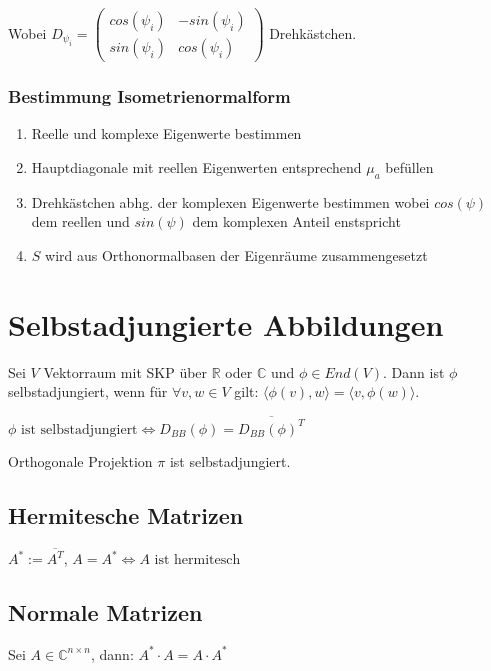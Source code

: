Wobei $D_{\psi_i} = \begin{pmatrix} cos(\psi_i) & -sin(\psi_i) \\ sin(\psi_i) & cos(\psi_i) \end{pmatrix}$ Drehkästchen.

\subsubsection*{Bestimmung Isometrienormalform}

\begin{enumerate}[leftmargin=4mm]
	\item Reelle und komplexe Eigenwerte bestimmen
	\item Hauptdiagonale mit reellen Eigenwerten entsprechend $\mu_a$ befüllen
	\item Drehkästchen abhg. der komplexen Eigenwerte bestimmen wobei $cos(\psi)$ dem reellen und $sin(\psi)$ dem komplexen Anteil enstspricht
	\item $S$ wird aus Orthonormalbasen der Eigenräume zusammengesetzt
\end{enumerate}

\section*{Selbstadjungierte Abbildungen}

Sei $V$ Vektorraum mit SKP über $\mathbb{R}$ oder $\mathbb{C}$ und $\phi \in End(V)$. Dann ist $\phi$ selbstadjungiert, wenn für $\forall v, w \in V$ gilt: $\langle \phi(v), w \rangle = \langle v, \phi(w) \rangle$.

$\phi \text{ ist selbstadjungiert} \Leftrightarrow D_{BB}(\phi)=\overline{D_{BB}(\phi)^T}$

Orthogonale Projektion $\pi$ ist selbstadjungiert.

\subsection*{Hermitesche Matrizen}

$A^* := \overline{A^T}$, $A = A^* \Leftrightarrow A \text{ ist hermitesch}$

\subsection*{Normale Matrizen}

Sei $A \in \mathbb{C}^{n\times n}$, dann: $A^* \cdot A = A \cdot A^*$

